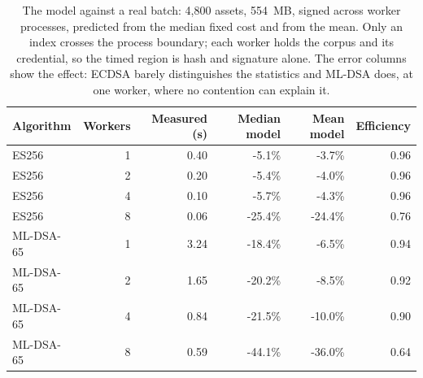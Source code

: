 \begin{table}[t]
\caption{The model against a real batch: 4,800 assets, 554~MB, signed across worker processes, predicted from the median fixed cost and from the mean. Only an index crosses the process boundary; each worker holds the corpus and its credential, so the timed region is hash and signature alone. The error columns show the effect: ECDSA barely distinguishes the statistics and ML-DSA does, at one worker, where no contention can explain it.}
\label{tab:archivebatch}
\begin{tabular}{lrrrrr}
\toprule
Algorithm & Workers & Measured (s) & Median model & Mean model & Efficiency\\
\midrule
ES256 & 1 & 0.40 & -5.1\% & -3.7\% & 0.96\\
ES256 & 2 & 0.20 & -5.4\% & -4.0\% & 0.96\\
ES256 & 4 & 0.10 & -5.7\% & -4.3\% & 0.96\\
ES256 & 8 & 0.06 & -25.4\% & -24.4\% & 0.76\\
ML-DSA-65 & 1 & 3.24 & -18.4\% & -6.5\% & 0.94\\
ML-DSA-65 & 2 & 1.65 & -20.2\% & -8.5\% & 0.92\\
ML-DSA-65 & 4 & 0.84 & -21.5\% & -10.0\% & 0.90\\
ML-DSA-65 & 8 & 0.59 & -44.1\% & -36.0\% & 0.64\\
\bottomrule
\end{tabular}
\end{table}
